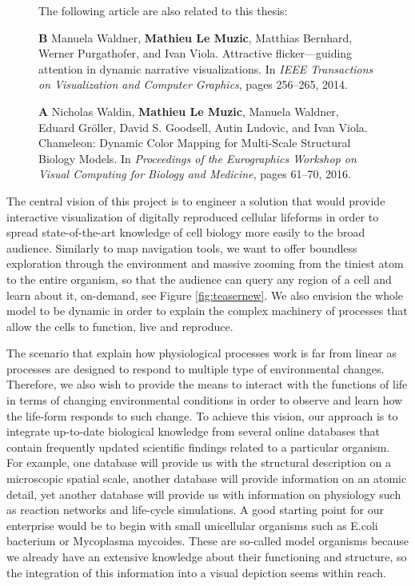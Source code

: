 \begin{figure}
{		The following article are also related to this thesis:	
		\begin{list}{}{}			
			\item[\textbf{B}]Manuela Waldner, \textbf{Mathieu Le Muzic}, Matthias Bernhard, Werner Purgathofer, and Ivan Viola. Attractive flicker—guiding attention in dynamic
			narrative visualizations. In \textit{IEEE Transactions on Visualization and Computer Graphics}, pages 256–265, 2014.	
			
			\item[\textbf{A}]Nicholas Waldin, \textbf{Mathieu Le Muzic}, Manuela Waldner, Eduard Gröller, David S. Goodsell, Autin Ludovic, and Ivan Viola. Chameleon: Dynamic Color Mapping for Multi-Scale Structural Biology Models. In \textit{Proceedings of the Eurographics Workshop on Visual Computing for Biology and Medicine}, pages 61–70, 2016.						
		\end{list}		
	}	
	\label{master-diagram}	
\end{figure}

The central vision of this project is to engineer a solution that would provide interactive visualization of digitally reproduced cellular lifeforms in order to spread state-of-the-art knowledge of cell biology more easily to the broad audience.
Similarly to map navigation tools, we want to offer boundless exploration through the environment and massive zooming from the tiniest atom to the entire organism, so that the audience can query any region of a cell and learn about it, on-demand, see Figure \ref{fig:teasernew}.
We also envision the whole model to be dynamic in order to explain the complex machinery of processes that allow the cells to function, live and reproduce.

The scenario that explain how physiological processes work is far from linear as processes are designed to respond to multiple type of environmental changes.
Therefore, we also wish to provide the means to interact with the functions of life in terms of changing environmental conditions in order to observe and learn how the life-form responds to such change. 
To achieve this vision, our approach is to integrate up-to-date biological knowledge from several online databases that contain frequently updated scientific findings related to a particular organism. 
For example, one database will provide us with the structural description on a microscopic spatial scale, another database will provide information on an atomic detail, yet another database will provide us with information on physiology such as reaction networks and life-cycle simulations.
A good starting point for our enterprise would be to begin with small unicellular organisms such as E.coli bacterium or Mycoplasma mycoides.
These are so-called model organisms because we already have an extensive knowledge about their functioning and structure, so the integration of this information into a visual depiction seems within reach. 

